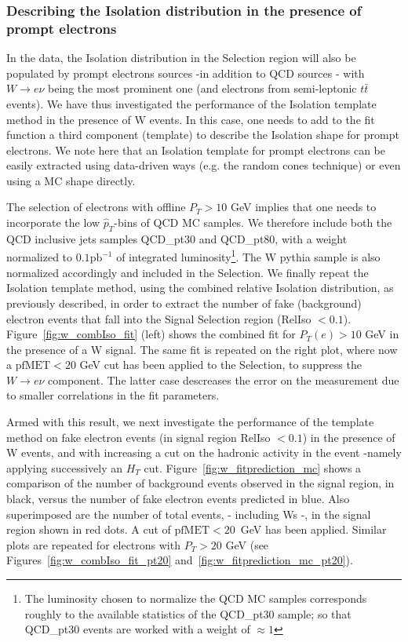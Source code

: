 \subsubsection{Describing the Isolation distribution in the presence of prompt electrons}
\label{mc_wcontamin}

In the data, the Isolation distribution in the Selection region will also be populated by prompt electrons sources -in addition to QCD sources - with  $W \rightarrow e\nu$ being the most prominent one (and electrons from semi-leptonic $t\bar{t}$ events). We have thus investigated the performance of the Isolation template method in the presence of W events. In this case, one needs to add to the fit function a third component (template) to describe the Isolation shape for prompt electrons. We note here that an Isolation template for prompt electrons can be easily extracted using data-driven ways (e.g. the random cones technique) or even using a MC shape directly. 

The selection of electrons with offline $P_{T} > 10$ GeV implies that one needs to incorporate the low $\hat{p}_{T}$-bins of QCD MC samples. We therefore include both the QCD inclusive jets samples QCD\_pt30 and QCD\_pt80, with a weight normalized to $0.1 \text{pb}^{-1}$ of integrated luminosity\footnote{The luminosity chosen to normalize the QCD MC samples corresponds roughly to the available statistics of the QCD\_pt30 sample; so that QCD\_pt30 events are worked with a weight of $\approx 1$}. The W pythia sample is also normalized accordingly and included in the Selection. We finally repeat the Isolation template method, using the combined relative Isolation distribution, as previously described, in order to extract the number of fake (background) electron events that fall into the Signal Selection region (RelIso $<0.1$). Figure~\ref{fig:w_combIso_fit} (left) shows the combined fit for $P_{T}(e)>10 $ GeV in the presence of a W signal. The same fit is repeated on the right plot, where now a $\text{pfMET} < 20 $ GeV cut has been applied to the Selection, to suppress the $W \rightarrow e\nu$ component. The latter case descreases the error on the measurement due to smaller correlations in the fit parameters. 

Armed with this result, we next investigate the performance of the template method on fake electron events (in signal region RelIso $< 0.1$) in the presence of W events, and with increasing a cut on the hadronic activity in the event -namely applying successively an $H_{T}$ cut. Figure~\ref{fig:w_fitprediction_mc} shows a comparison of the number of background events observed in the signal region, in black, versus the number of fake electron events predicted in blue. Also superimposed are the number of total events, - including Ws -, in the signal region shown in red dots. A cut of $\text{pfMET} < 20$~GeV has been applied. Similar plots are repeated for electrons with $P_{T}> 20$ GeV (see Figures~\ref{fig:w_combIso_fit_pt20} and~\ref{fig:w_fitprediction_mc_pt20}).

